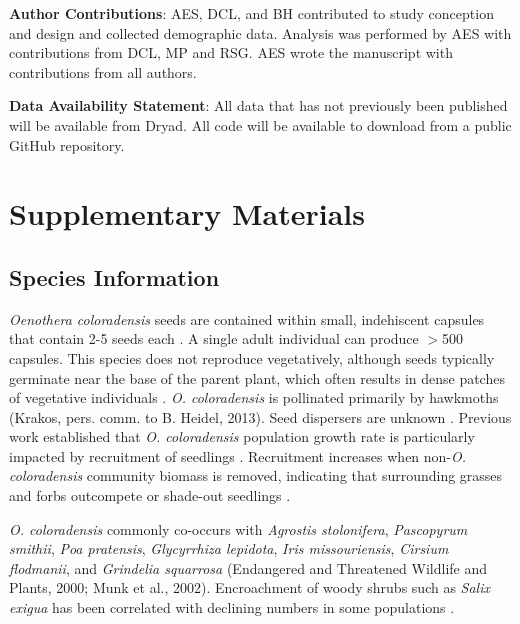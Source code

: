 \documentclass[12pt, letterpaper]{article}
\renewcommand{\thesection}{} %
\begin{document}
\small{
\textbf{Author Contributions}: AES, DCL, and BH contributed to study conception and design and collected demographic data. Analysis was performed by AES with contributions from DCL, MP and RSG. AES wrote the manuscript with contributions from all authors. 
} 

\small{\textbf{Data Availability Statement}: All data that has not previously been published will be available from Dryad. All code will be available to download from a public GitHub repository.}



\newpage

\setcounter{figure}{0}
\setcounter{table}{0}
\setcounter{section}{0}
\setcounter{page}{1}

\renewcommand{\thepage}{S\arabic{page}}
\renewcommand{\thesection}{S\arabic{section}}
\renewcommand{\thetable}{S\arabic{table}}
\renewcommand{\thefigure}{S\arabic{figure}}

\section{Supplementary Materials}
\normalfont
\subsection{Species Information}
\textit{Oenothera coloradensis} seeds are contained within small, indehiscent capsules that contain 2-5 seeds each \cite{Burgess2005CapsuleColoradensis}. A single adult individual can produce $>$500 capsules. This species does not reproduce vegetatively, although seeds typically germinate near the base of the parent plant, which often results in dense patches of vegetative individuals \cite{Heidel202133-YearWyoming}. \textit{O. coloradensis} is pollinated primarily by hawkmoths (Krakos, pers. comm. to B. Heidel, 2013). Seed dispersers are unknown \cite{Floyd1998, Heidel202133-YearWyoming}. Previous work established that \textit{O. coloradensis} population growth rate is particularly impacted by recruitment of seedlings \cite{Floyd1998}. Recruitment increases when non-\textit{O. coloradensis} community biomass is removed, indicating that surrounding grasses and forbs outcompete or shade-out seedlings \cite{Munk2002RosetteSpecies}.
\nocite{krakosPersonalComm}

\textit{O. coloradensis} commonly co-occurs with \textit{Agrostis stolonifera}, \textit{Pascopyrum smithii}, \textit{Poa pratensis}, \textit{Glycyrrhiza lepidota}, \textit{Iris missouriensis}, \textit{Cirsium flodmanii}, and \textit{Grindelia squarrosa} (Endangered and Threatened Wildlife and Plants, 2000; Munk et al., 2002). Encroachment of woody shrubs such as \textit{Salix exigua} has been correlated with declining numbers in some populations \cite{Heidel202133-YearWyoming}.
\end{document}
